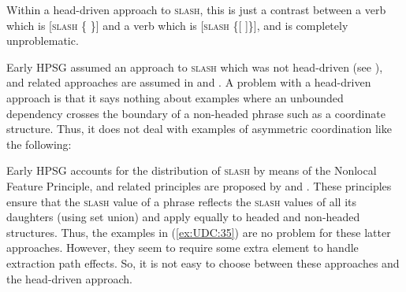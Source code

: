 \documentclass[output=paper
,notxmath 
 	        ,biblatex
                ,babelshorthands
                ,newtxmath
                ,draftmode
                ,colorlinks, citecolor=brown
]{langscibook}
\begin{document}
\eal
\label{ex:UDC:34}
\zl

\noindent
Within a head-driven approach to \textsc{slash}, this is just a contrast between a
verb which is [\textsc{slash} \{ \}] and a verb which is [\textsc{slash}
\{[ ]\}], and is completely unproblematic.

Early HPSG assumed an approach to \textsc{slash} which was not
head-driven (see \citealt[Chapter~4]{Pollard:Sag:94}), and related
approaches are assumed in \citet{Levine:Hukari:06} and \citet[497]{Chaves:12}.  A problem
with a head-driven approach is that it says nothing about examples
where an unbounded dependency crosses the boundary of a non-headed
phrase such as a coordinate structure. Thus, it does not deal with
examples of asymmetric coordination like the following:

\begin{exe} \ex \begin{xlist} \label{ex:UDC:35}
\ex[]{ How much can you [drink \trace{}] and [still stay sober]]?}

\end{xlist}
\end{exe}


\noindent
Early HPSG \citep[Chapter~4]{Pollard:Sag:94} accounts for the distribution of
\textsc{slash} by means of the Nonlocal Feature Principle, and related
principles are proposed by \citet[354]{Levine:Hukari:06} and
\citet[497]{Chaves:12}. These principles ensure that the \textsc{slash}
value of a phrase reflects the \textsc{slash} values of all its
daughters (using set union) and apply equally to headed and non-headed
structures. Thus, the examples in (\ref{ex:UDC:35}) are no problem for
these latter approaches. However, they seem to require some extra element to
handle extraction path effects. So, it is not easy to choose between
these approaches and the head-driven approach.\label{page-end-extraction-path-effects}
\end{document}
